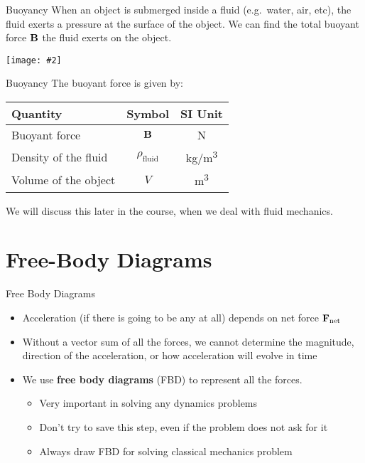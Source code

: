 \documentclass[12pt,compress,aspectratio=169]{beamer}
\newcommand{\pic}[2]{\texttt{[image: \#2]}}
\newcommand{\mb}[1]{\ensuremath\mathbf{#1}}
\newcommand{\eq}[2]{\vspace{#1}{\Large\begin{displaymath}#2\end{displaymath}}}
\begin{document}
\begin{frame}{Buoyancy}
  When an object is submerged inside a fluid (e.g.\ water, air, etc), the fluid
  exerts a pressure at the surface of the object. We can find the total buoyant 
  force $\mb{B}$ the fluid exerts on the object.
  \begin{center}
    \pic{.4}{graphics/rock_fbvectors.png}
  \end{center}
\end{frame}



\begin{frame}{Buoyancy}
  The buoyant force is given by:
  
  \eq{-.1in}{
    \boxed{\mb{B}=\rho_\mathrm{fluid}gV\bm{\hat{k}}}
  }
  \begin{center}
    \begin{tabular}{l|c|c}
      \rowcolor{pink}
      \textbf{Quantity} & \textbf{Symbol} & \textbf{SI Unit} \\ \hline
      Buoyant force & $\mb{B}$  & \si{\newton} \\
      Density of the fluid & $\rho_\mathrm{fluid}$ & \si{\kg/\m^3}\\
      Volume of the object & $V$ & \si{\metre^3}
    \end{tabular}
  \end{center}
  We will discuss this later in the course, when we deal with fluid mechanics.
\end{frame}



\section{Free-Body Diagrams}


\begin{frame}{Free Body Diagrams}
  \begin{itemize}
  \item Acceleration (if there is going to be any at all) depends
    on net force $\mb{F}_\mathrm{net}$
  \item Without a vector sum of all the forces, we cannot determine the
    magnitude, direction of the acceleration, or how acceleration will evolve
    in time
  \item We use \textbf{free body diagrams} (FBD) to represent all the forces.
    \begin{itemize}
    \item Very important in solving any dynamics problems
    \item Don't try to save this step, even if the problem does not ask for it
    \item Always draw FBD for solving classical mechanics problem
    \end{itemize}
  \end{itemize}
\end{frame}
\end{document}
